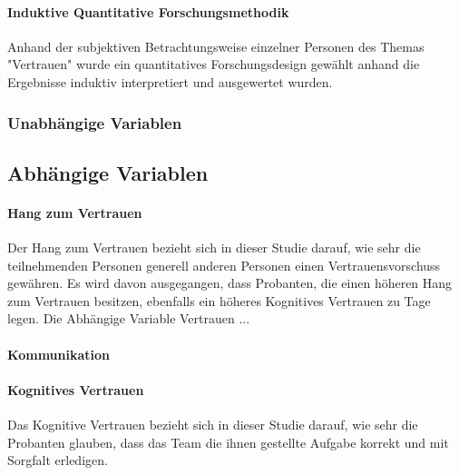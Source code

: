\documentclass[a4paper,11pt]{article}%
\renewcommand{\\}{\vspace*{0.5\baselineskip} \newline}
\begin{document}
			\paragraph{Induktive Quantitative Forschungsmethodik}
				Anhand der subjektiven Betrachtungsweise einzelner Personen des Themas "Vertrauen" wurde ein quantitatives Forschungsdesign gewählt anhand die Ergebnisse induktiv interpretiert und ausgewertet wurden.
				
			\subsubsection{Unabhängige Variablen}

	\subsection{Abhängige Variablen}
		\paragraph{Hang zum  Vertrauen}
Der Hang zum Vertrauen bezieht sich in dieser Studie darauf, wie sehr die teilnehmenden Personen generell anderen Personen einen Vertrauensvorschuss gewähren.
Es wird davon ausgegangen, dass Probanten, die einen höheren Hang zum Vertrauen besitzen, ebenfalls ein höheres Kognitives Vertrauen zu Tage legen. 
			Die Abhängige Variable Vertrauen ...	
\paragraph{Kommunikation}
\paragraph{Kognitives Vertrauen}
Das Kognitive Vertrauen bezieht sich in dieser Studie darauf, wie sehr die Probanten glauben, dass das Team die ihnen gestellte Aufgabe korrekt und mit Sorgfalt erledigen.
\end{document}
